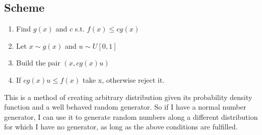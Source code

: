 \subsection{Scheme}
\begin{enumerate}
    \item Find $g(x)$ and  $c$ s.t. $f(x) \le cg(x)$ 
    \item Let $x \sim g(x)$ and  $u \sim U[0,1]$ 
    \item Build the pair $(x,cg(x)u)$ 
    \item If $cg(x)u \le f(x)$ take x, otherwise reject it.
\end{enumerate}
\nt
{
    This is a method of creating arbitrary distribution given its probability density function and a well behaved random generator. So if I have a normal number generator, I can use it to generate random numbers along a different distribution for which I have no generator, as long as the above conditions are fulfilled.
}
\clearpage
{}
